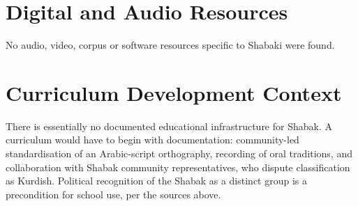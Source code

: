 \documentclass[12pt]{article}
\begin{document}
\section{Digital and Audio Resources}
No audio, video, corpus or software resources specific to Shabaki were found.

\section{Curriculum Development Context}
There is essentially no documented educational infrastructure for Shabak. A curriculum would have to begin with documentation: community-led standardisation of an Arabic-script orthography, recording of oral traditions, and collaboration with Shabak community representatives, who dispute classification as Kurdish. Political recognition of the Shabak as a distinct group is a precondition for school use, per the sources above.
\end{document}
